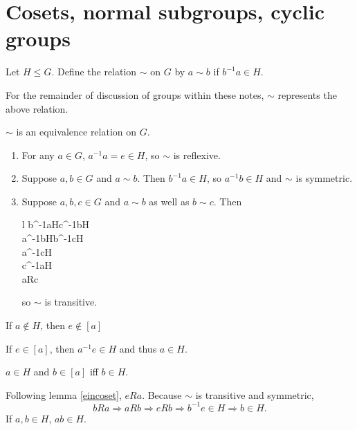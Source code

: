 \documentclass{article}
\begin{document}
\section{Cosets, normal subgroups, cyclic groups}
\begin{defi}
	Let \(H\leq G\). Define the relation \(\sim\) on \(G\) by \(a\sim b\) if \(b^{-1}a\in H\).
\end{defi}
\begin{rema}
	For the remainder of discussion of groups within these notes, \(\sim\) represents the above relation.
\end{rema}
\begin{thm}
	\(\sim\) is an equivalence relation on \(G\).
	\begin{IEEEproof}
	\begin{enumerate}
		\item For any \(a\in G\), \(a^{-1}a=e\in H\), so \(\sim\) is reflexive.
		\item Suppose \(a,b\in G\) and \(a\sim b\). Then \(b^{-1}a\in H\), so \(a^{-1}b\in H\) and \(\sim\) is symmetric.
		\item Suppose \(a,b,c\in G\) and \(a\sim b\) as well as \(b\sim c\). Then
			\begin{IEEEeqnarray*}{l}
				b^{-1}a\in H\wedge c^{-1}b\in H\\
				a^{-1}b\in H\wedge b^{-1}c\in H\\
				a^{-1}c\in H\\
				c^{-1}a\in H\\
				\Rightarrow aRc
			\end{IEEEeqnarray*}
			so \(\sim\) is transitive.
	\end{enumerate}
	\end{IEEEproof}
\end{thm}
\begin{lem}
	If \(a\notin H\), then \(e\notin [a]\)
	\label{eincoset}
	\begin{IEEEproof}
		If \(e\in [a]\), then \(a^{-1}e\in H\) and thus \(a\in H\).
	\end{IEEEproof}
\end{lem}
\begin{lem}
	\(a\in H\) and \(b\in [a]\) iff \(b\in H\).
	\begin{IEEEproof}
		Following lemma \ref{eincoset}, \(eRa\). Because \(\sim\) is transitive and symmetric,
		\begin{equation*}
			bRa\Rightarrow aRb\Rightarrow eRb\Rightarrow b^{-1}e\in H\Rightarrow b\in H.
		\end{equation*}
		If \(a,b\in H\), \(ab\in H\).
	\end{IEEEproof}
\end{lem}
\end{document}
